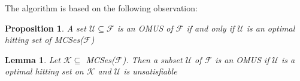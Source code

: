 \documentclass{article}
\newcommand\m[1]{\mathcal{#1}}
\newtheorem{lemma}[lem]{Lemma}
\newtheorem{proposition}[propo]{Proposition}
\begin{document}
The algorithm is based on the following observation:

\begin{proposition}\label{prop:optimal-hitting-set}
  A set $\m{U} \subseteq \m{F}$ is an OMUS of $\m{F}$ if and only if $\m{U}$ is an optimal hitting set of MCSes($\m{F}$)
\end{proposition}

\begin{lemma}\label{lemma:K}
  Let $\m{K}  \subseteq$ MCSes($\m{F}$). Then a subset $\m{U}$ of $\m{F}$ is an OMUS if $\m{U}$ is a optimal hitting set on $\m{K}$ and $\m{U}$ is unsatisfiable
\end{lemma}




\end{document}
